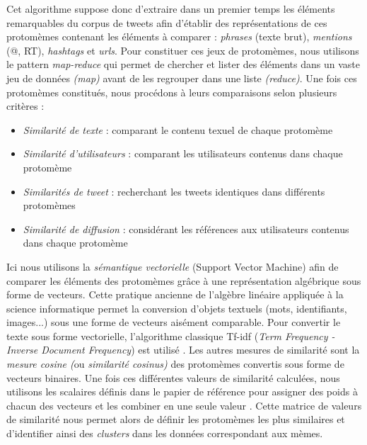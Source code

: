Cet algorithme suppose donc d{\textquoteright}extraire dans un premier temps les éléments remarquables du corpus de tweets afin d{\textquoteright}établir des représentations de ces protomèmes contenant les éléments à comparer : \textit{phrases} (texte brut), \textit{mentions }(@, RT), \textit{hashtags} et \textit{urls}. Pour constituer ces jeux de protomèmes, nous utilisons le pattern \textit{map-reduce} qui permet de chercher et lister des éléments dans un vaste jeu de données \textit{(map)} avant de les regrouper dans une liste \textit{(reduce)}. Une fois ces protomèmes constitués, nous procédons à leurs comparaisons selon plusieurs critères :

\begin{itemize}
    \item \textit{Similarité de texte} : comparant le contenu texuel de chaque protomème 
    \item \textit{Similarité d{\textquoteright}utilisateurs} : comparant les utilisateurs contenus dans chaque protomème
    \item \textit{Similarités de tweet} : recherchant les tweets identiques dans différents protomèmes
    \item \textit{Similarité de diffusion} : considérant les références aux utilisateurs contenus dans chaque protomème
\end{itemize}

Ici nous utilisons la \textit{sémantique vectorielle} (Support Vector Machine) afin de comparer les éléments des protomèmes gr\^ace à une représentation algébrique sous forme de vecteurs. Cette pratique ancienne de l{\textquoteright}algèbre linéaire appliquée à la science informatique \citep{Salton1975} permet la conversion d{\textquoteright}objets textuels (mots, identifiants, images...) sous une forme de vecteurs aisément comparable. Pour convertir le texte sous forme vectorielle, l{\textquoteright}algorithme classique Tf-idf (\textit{Term Frequency - Inverse Document Frequency}) est utilisé \citep{Soucy2005}. Les autres mesures de similarité sont la \textit{mesure cosine (}ou \textit{similarité cosinus) }des protomèmes convertis sous forme de vecteurs binaires. Une fois ces différentes valeurs de similarité calculées, nous utilisons les scalaires définis dans le papier de référence pour assigner des poids à chacun des vecteurs et les combiner en une seule valeur \citep{Ferrara2013}. Cette matrice de valeurs de similarité nous permet alors de définir les protomèmes les plus similaires et d{\textquoteright}identifier ainsi des \textit{clusters }dans les données correspondant aux mèmes.

